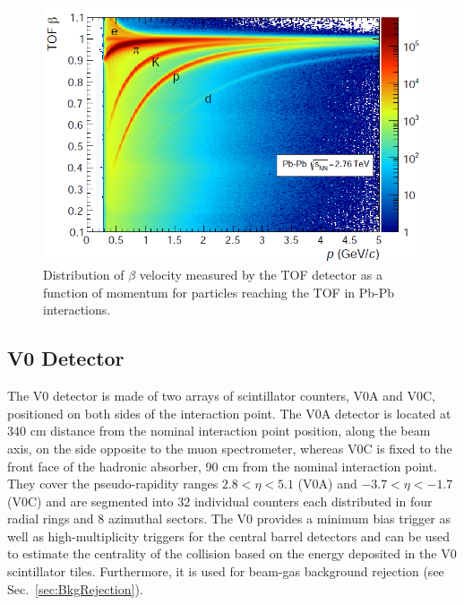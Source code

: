 \begin{figure}[!h]
\centering
\includegraphics[width=.7\textwidth]{FigCap3/TOFpid.png}
\caption{Distribution of $\beta$ velocity measured by the TOF detector as a function of momentum for particles reaching the
TOF in Pb-Pb interactions.}
\label{fig:TOFpid}
\end{figure}


\subsection{V0 Detector} 
\label{sec:V0}
The V0 detector is made of two arrays of scintillator counters, V0A and V0C, positioned on both sides of 
the interaction point. The V0A detector is located at 340 cm distance from the nominal interaction point position, 
along the beam axis, on the side opposite to the muon spectrometer,
whereas V0C is fixed to the front face of the hadronic absorber, 90 cm from the nominal interaction point. They cover
the pseudo-rapidity ranges $2.8 < \eta < 5.1$ (V0A) and $-3.7 < \eta < -1.7$ (V0C) and are segmented
into 32 individual counters each distributed in four radial rings and 8 azimuthal sectors. 
The V0 provides a minimum bias trigger as well as high-multiplicity triggers for the central barrel detectors and
  can be used to estimate the centrality of the collision based on the energy deposited in the V0 scintillator tiles.
Furthermore, it is used for beam-gas background rejection (see Sec.~\ref{sec:BkgRejection}).



